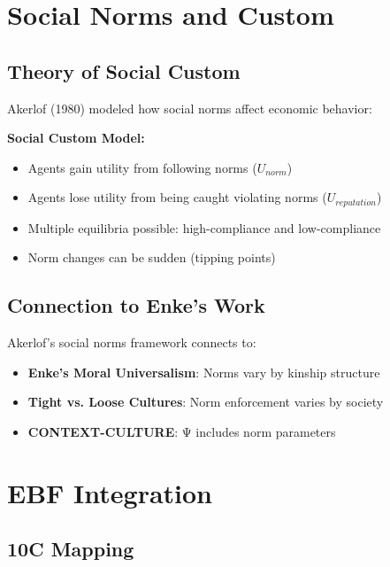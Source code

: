 \section{Social Norms and Custom}

\subsection{Theory of Social Custom}

Akerlof (1980) modeled how social norms affect economic behavior:

\begin{tcolorbox}[colback=yellow!10!white, colframe=yellow!75!black]
\textbf{Social Custom Model:}
\begin{itemize}
    \item Agents gain utility from following norms ($U_{norm}$)
    \item Agents lose utility from being caught violating norms ($U_{reputation}$)
    \item Multiple equilibria possible: high-compliance and low-compliance
    \item Norm changes can be sudden (tipping points)
\end{itemize}
\end{tcolorbox}

\subsection{Connection to Enke's Work}

Akerlof's social norms framework connects to:
\begin{itemize}
    \item \textbf{Enke's Moral Universalism}: Norms vary by kinship structure
    \item \textbf{Tight vs. Loose Cultures}: Norm enforcement varies by society
    \item \textbf{CONTEXT-CULTURE}: Ψ includes norm parameters
\end{itemize}

\section{EBF Integration}

\subsection{10C Mapping}

